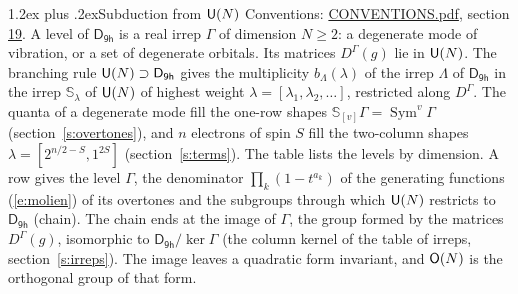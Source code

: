 \documentclass[10pt,a4paper]{article}
\makeatletter
\renewcommand\section{\@startsection{section}{1}{\z@}{-3ex plus -1ex minus -.2ex}%
  {1.2ex plus .2ex}{\normalfont\large\sffamily\bfseries\color{parttitle}}}
\numberwithin{equation}{section}
\newcommand{\grp}[1]{\mathsf{#1}}
\newcommand{\repD}[1]{D^{#1}}
\newcommand{\schur}[1]{\mathbb{S}_{#1}}
\newcommand{\shape}[1]{[#1]}
\makeatother
\begin{document}
\section{Subduction from \texorpdfstring{$\grp{U(\mathnormal{N})}$}{U(N)}}\label{s:unitary}
Conventions: \href{../../CONVENTIONS.pdf}{CONVENTIONS.pdf}, section \href{../../CONVENTIONS.pdf\#conv.19}{19}.
\leavevmode\label{n:local.level.dimension}A level of $\grp{D_{9h}}$ is a real irrep $\Gamma$ of dimension $N \ge 2$: a degenerate mode of vibration, or a set of degenerate orbitals. \label{n:group.unitary}Its matrices $\repD{\Gamma}(g)$ lie in $\grp{U(\mathnormal{N})}$. \label{n:irrep.schur}\label{n:shape.partition}\label{n:local.partition}\label{n:function.multiplicity.unitary}The branching rule $\grp{U(\mathnormal{N})} \supset \grp{D_{9h}}$ gives the multiplicity $b_\Lambda(\lambda)$ of the irrep $\Lambda$ of $\grp{D_{9h}}$ in the irrep $\schur{\lambda}$ of $\grp{U(\mathnormal{N})}$ of highest weight $\lambda = \shape{\lambda_1, \lambda_2, \dots}$, restricted along $\repD{\Gamma}$. \label{n:local.partition.power}\label{n:local.electrons}\label{n:local.spin}The quanta of a degenerate mode fill the one-row shapes $\schur{\shape{v}}\Gamma = \operatorname{Sym}^{v}\Gamma$ (section~\ref{s:overtones}), and $n$ electrons of spin $S$ fill the two-column shapes $\lambda = \shape{2^{n/2-S}, 1^{2S}}$ (section~\ref{s:terms}).
The table lists the levels by dimension. \label{n:head.level}\label{n:head.denominator}\label{n:index.overtone.denominator}\label{n:head.chain}A row gives the level $\Gamma$, the denominator $\prod_k (1 - t^{a_k})$ of the generating functions (\ref{e:molien}) of its overtones and the subgroups through which $\grp{U(\mathnormal{N})}$ restricts to $\grp{D_{9h}}$ (chain). The chain ends at the image of $\Gamma$, the group formed by the matrices $\repD{\Gamma}(g)$, isomorphic to $\grp{D_{9h}}/\ker\Gamma$ (the column kernel of the table of irreps, section~\ref{s:irreps}). The image leaves a quadratic form invariant, and $\grp{O(\mathnormal{N})}$ is the orthogonal group of that form.
\end{document}
